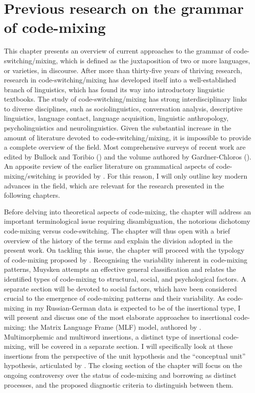\chapter{Previous research on the grammar of code-mixing}\label{CM}
This chapter presents an overview of current approaches to the grammar of code-switching/mixing, which is defined as the juxtaposition of two or more languages, or varieties, in discourse. After more than thirty-five years of thriving research, research in code-switching/mixing has developed itself into a well-established branch of linguistics, which has found its way into introductory linguistic textbooks. The study of code-switching/mixing has strong interdisciplinary links to diverse disciplines, such as sociolinguistics, conversation analysis, descriptive linguistics, language contact, language acquisition, linguistic anthropology, psycholinguistics and neurolinguistics. Given the substantial increase in the amount of literature devoted to code-switching/mixing, it is impossible to provide a complete overview of the field. Most comprehensive surveys of recent work are  edited by Bullock and Toribio (\citeyear{bullock-toribio}) and the volume  authored by Gardner-Chloros (\citeyear{gardner-chloros_code-switching_2009}). An apposite review of the earlier literature on grammatical aspects of code-mixing/switching is provided by  \citet[Chapter 1]{boumans-syntax-1998}. For this reason, I will only outline key modern advances in the field, which are relevant for the research presented in the following chapters. 

Before delving into theoretical aspects of code-mixing, the chapter will address an important terminological issue requiring disambiguation, the notorious dichotomy code-mixing versus code-switching. The chapter will thus open with a brief overview of the history of the terms and explain the division adopted in the present work. On tackling this issue, the chapter will proceed with the typology of code-mixing proposed by \citet[][]{muysken-bilingual-2000}. Recognising the variability inherent in code-mixing patterns, Muysken attempts an effective general classification and relates the identified types of code-mixing to structural, social, and psychological factors. A separate section will be devoted to social factors, which have been considered crucial to the emergence of  code-mixing patterns and their variability. As code-mixing in my Russian-German data is expected to be of the insertional type, I will present and discuss one of the most elaborate approaches to insertional code-mixing: the Matrix Language Frame (MLF) model, authored by \citet[][]{myers-scotton-duelling-1993,myers-scotton-contact-2002}. Multimorphemic and multiword insertions, a distinct type of insertional code-mixing, will be covered in a separate section. I will specifically look at these insertions from the perspective of the unit hypothesis and the ``conceptual unit'' hypothesis, articulated by \citet[][]{backus-evidence-1999,backus-units-2003}. The closing section of the chapter will focus on the ongoing controversy over the status of code-mixing and borrowing as distinct processes, and the proposed diagnostic criteria to distinguish between them.\largerpage

